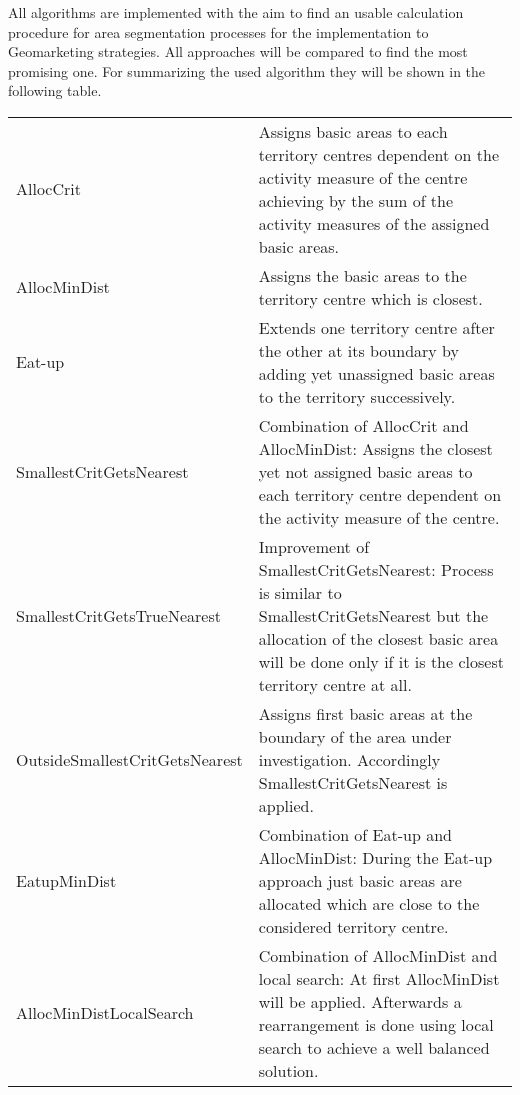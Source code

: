 All algorithms are implemented with the aim to find an usable calculation procedure for area segmentation processes for the implementation to Geomarketing strategies. All approaches will be compared to find the most promising one. For summarizing the used algorithm they will be shown in the following table.

\newpage


\begin{table}[H]
	\begin{tabular}{|p{5.5cm}|>{\RaggedRight}p{7.5cm}|}
		\hline
		& \centering{Short explanation} \tabularnewline
		\hline
		AllocCrit & Assigns basic areas to each territory centres dependent on the activity measure of the centre achieving by the sum of the activity measures of the assigned basic areas.
		\tabularnewline
		\hline
		AllocMinDist & Assigns the basic areas to the territory centre which is closest.
		\tabularnewline
		\hline
		Eat-up & Extends one territory centre after the other at its boundary by adding yet unassigned basic areas to the territory successively.
		\tabularnewline
		\hline
		SmallestCritGetsNearest & Combination of AllocCrit and AllocMinDist: Assigns the closest yet not assigned basic areas to each territory centre dependent on the activity measure of the centre.
		\tabularnewline
		\hline
		SmallestCritGetsTrueNearest & Improvement of SmallestCritGetsNearest: Process is similar to SmallestCritGetsNearest but the allocation of the closest basic area will be done only if it is the closest territory centre at all.
		\tabularnewline
		\hline
		OutsideSmallestCritGetsNearest & Assigns first basic areas at the boundary of the area under investigation. Accordingly SmallestCritGetsNearest is applied.
		\tabularnewline
		\hline
		EatupMinDist & Combination of Eat-up and AllocMinDist: During the Eat-up approach just basic areas are allocated which are close to the considered territory centre.
		\tabularnewline
		\hline
		AllocMinDistLocalSearch & Combination of AllocMinDist and local search: At first AllocMinDist will be applied. Afterwards a rearrangement is done using local search to achieve a well balanced solution.
		\tabularnewline
		\hline
	\end{tabular}
\end{table}

\newpage


